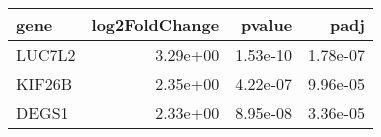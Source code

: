 \begin{tabular}{lrrr}
\toprule
  gene &  log2FoldChange &   pvalue &     padj \\
\midrule
LUC7L2 &        3.29e+00 & 1.53e-10 & 1.78e-07 \\
KIF26B &        2.35e+00 & 4.22e-07 & 9.96e-05 \\
 DEGS1 &        2.33e+00 & 8.95e-08 & 3.36e-05 \\
\bottomrule
\end{tabular}
